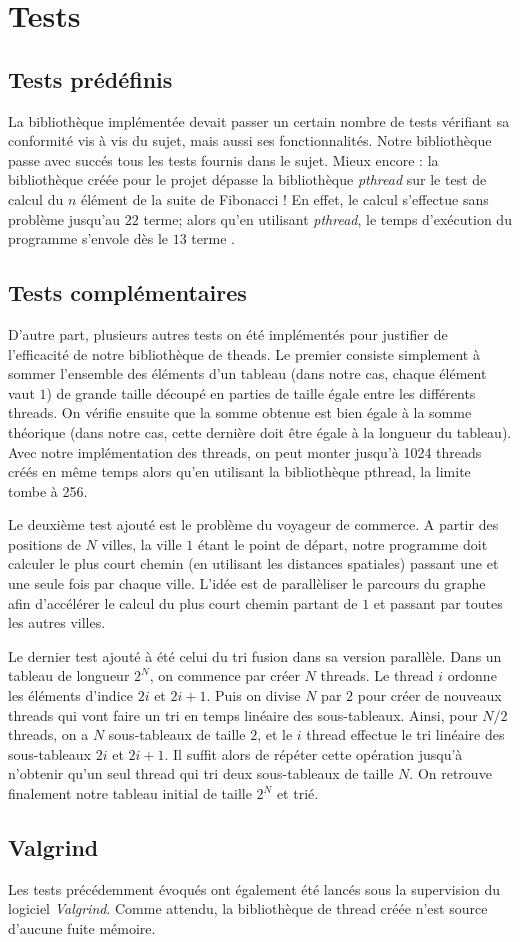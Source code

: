 \section{Tests}

\subsection{Tests prédéfinis}


La bibliothèque implémentée devait passer un certain nombre de tests vérifiant sa conformité vis à vis du sujet, mais aussi ses fonctionnalités. Notre bibliothèque passe avec succés tous les tests fournis dans le sujet.
Mieux encore : la bibliothèque créée pour le projet dépasse la bibliothèque \textit{pthread} sur le test de calcul du $n$ élément de la suite de Fibonacci ! En effet, le calcul s'effectue sans problème jusqu'au $22$ terme; alors qu'en utilisant \textit{pthread}, le temps d'exécution du programme s'envole dès le $13$ terme .


\subsection{Tests complémentaires}

D'autre part, plusieurs autres tests on été implémentés pour justifier de l'efficacité de notre bibliothèque de theads. Le premier consiste simplement à sommer l'ensemble des éléments d'un tableau (dans notre cas, chaque élément vaut $1$) de grande taille découpé en parties de taille égale entre les différents threads. On vérifie ensuite que la somme obtenue est bien égale à la somme théorique (dans notre cas, cette dernière doit être égale à la longueur du tableau). Avec notre implémentation des threads, on peut monter jusqu’à 1024 threads créés en même temps alors qu’en utilisant la bibliothèque pthread, la limite tombe à 256.

Le deuxième test ajouté est le problème du voyageur de commerce. A partir des positions de $N$ villes, la ville $1$ étant le point de départ, notre programme doit calculer le plus court chemin (en utilisant les distances spatiales) passant une et une seule fois par chaque ville. L'idée est de parallèliser le parcours du graphe afin d'accélérer le calcul du plus court chemin partant de $1$ et passant par toutes les autres villes.

Le dernier test ajouté à été celui du tri fusion dans sa version parallèle. Dans un tableau de longueur $2^{N}$, on commence par créer $N$ threads. Le thread $i$ ordonne les éléments d'indice $2i$ et $2i+1$. Puis on divise $N$ par $2$ pour créer de nouveaux threads qui vont faire un tri en temps linéaire des sous-tableaux. Ainsi, pour $N/2$ threads, on a $N$ sous-tableaux de taille $2$, et le $i$ thread effectue le tri linéaire des sous-tableaux $2i$ et $2i+1$. Il suffit alors de répéter cette opération jusqu'à n'obtenir qu'un seul thread qui tri deux sous-tableaux de taille $N$. On retrouve finalement notre tableau initial de taille $2^{N}$ et trié.


\subsection{Valgrind}
Les tests précédemment évoqués ont également été lancés sous la supervision du logiciel \textit{Valgrind}. Comme attendu, la bibliothèque de thread créée n'est source d'aucune fuite mémoire.
